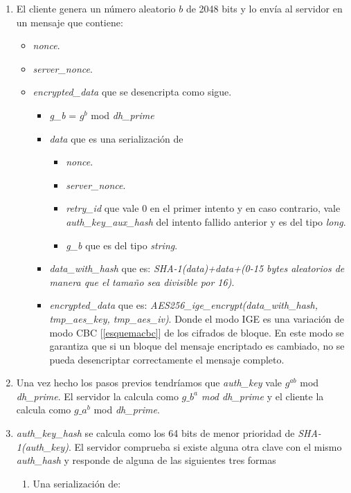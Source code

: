 \begin{enumerate}
	\item El cliente genera un número aleatorio $b$ de 2048 bits y lo envía al servidor en un mensaje que contiene:
		\begin{itemize}
			\item \emph{nonce}.
			\item \emph{server\_nonce}.
			\item \emph{encrypted\_data} que se desencripta como sigue.
				\begin{itemize}
					\item \emph{g\_b} = $g^b$ mod \emph{dh\_prime}
					\item \emph{data} que es una serialización de 
						\begin{itemize}
							\item \emph{nonce}.
							\item \emph{server\_nonce}.
							\item \emph{retry\_id} que vale 0 en el primer intento y en caso contrario, vale \emph{auth\_key\_aux\_hash} del intento fallido anterior y es del tipo \emph{long}.
							\item \emph{g\_b} que es del tipo \emph{string}.
						\end{itemize}
					\item \emph{data\_with\_hash} que es: \emph{SHA-1(data)+data+(0-15 bytes aleatorios de manera que el tamaño sea divisible por 16)}.
					\item \emph{encrypted\_data} que es: \emph{AES256\_ige\_encrypt(data\_with\_hash, tmp\_aes\_key, tmp\_aes\_iv)}. Donde el modo IGE es una variación de modo CBC [\ref{esquemacbc}] de los cifrados de bloque. En este modo se garantiza que si un bloque del mensaje encriptado es cambiado, no se pueda desencriptar correctamente el mensaje completo.
				\end{itemize}
		\end{itemize}
	\item Una vez hecho los pasos previos tendríamos que \emph{auth\_key} vale $g^{ab}$ mod \emph{dh\_prime}. El servidor la calcula como \emph{$g\_b^{a}$ mod \emph{dh\_prime}} y el cliente la calcula como $g\_a^b$ mod \emph{dh\_prime}.
	\item \emph{auth\_key\_hash} se calcula como los 64 bits de menor prioridad de \emph{SHA-1(auth\_key)}. El servidor comprueba si existe alguna otra clave con el mismo \emph{auth\_hash} y responde de alguna de las siguientes tres formas
	\begin{enumerate}
		\item Una serialización de: 

\end{enumerate}
\end{enumerate}
